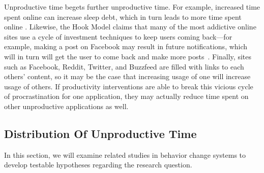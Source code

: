 Unproductive time begets further unproductive time. For example, increased time spent online can increase sleep debt, which in turn leads to more time spent online \cite{Mark:2016:SDS:2858036.2858437}. Likewise, the Hook Model claims that many of the most addictive online sites use a cycle of investment techniques to keep users coming back---for example, making a post on Facebook may result in future notifications, which will in turn will get the user to come back and make more posts~\cite{eyal2014hooked}. Finally, sites such as Facebook, Reddit, Twitter, and Buzzfeed are filled with links to each others' content, so it may be the case that increasing usage of one will increase usage of others. If productivity interventions are able to break this vicious cycle of procrastination for one application, they may actually reduce time spent on other unproductive applications as well.



\subsection{Distribution Of Unproductive Time}



In this section, we will examine related studies in behavior change systems to develop testable hypotheses regarding the research question. 


